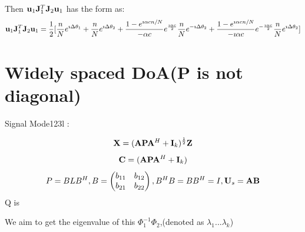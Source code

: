 \documentclass[11pt,a4paper]{article}
\begin{document}
Then $\mathbf{u}_1{\mathbf{J}}_1^T {\mathbf{J}}_2 \mathbf{u}_1$ has the form as:
\begin{align*}
    \mathbf{u}_1{\mathbf{J}}_1^T {\mathbf{J}}_2 \mathbf{u}_1 = \frac{1}{2}[\frac{n}{N}e^{\imath\Delta\theta_1}+\frac{n}{N}e^{\imath\Delta\theta_2}+\frac{1-e^{\imath\alpha c n/N}}{-\alpha c}e^{\frac{\imath \alpha c}{2}}\frac{n}{N}e^{-\imath\Delta\theta_2}+\frac{1-e^{\imath\alpha c n/N}}{-\imath \alpha c}e^{-\frac{\imath \alpha c}{2}}\frac{n}{N}e^{\imath\Delta\theta_2}]
\end{align*}

\section{Widely spaced DoA(P is not diagonal)}
Signal Mode123l :
 
$${\mathbf{X}} = ({\mathbf{A}}{\mathbf{P}}{\mathbf{A}}^H + \mathbf{I}_k)^{\frac{1}{2}}{\mathbf{Z}}$$
$${\mathbf{C}} = ({\mathbf{A}}{\mathbf{P}}{\mathbf{A}}^H + \mathbf{I}_k)$$
\begin{equation}
    P = B L B^H , B = \begin{pmatrix} b_{11} & b_{12} \\ b_{21} & b_{22}\end{pmatrix}, B^HB = BB^H = I,{\mathbf{U}}_s = {\mathbf{A}} \mathbf{B} 
\end{equation}
Q is 

We aim to get the eigenvalue of this $\Phi_1^{-1} \Phi_2$,(denoted as $\lambda_1 ... \lambda_k$)
\end{document}
